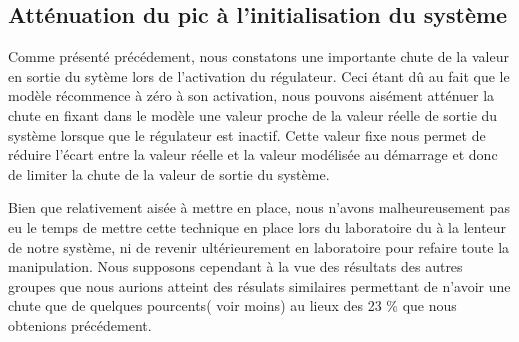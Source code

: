 \subsection{Atténuation du pic à l'initialisation du système}

Comme présenté précédement, nous constatons une importante chute de la valeur en sortie du sytème lors de l'activation du régulateur. Ceci étant dû au fait que le modèle récommence à zéro à son activation, nous pouvons aisément atténuer la chute en fixant dans le modèle une valeur proche de la valeur réelle de sortie du système lorsque que le régulateur est inactif. Cette valeur fixe nous permet de réduire l'écart entre la valeur réelle et la valeur modélisée au démarrage et donc de limiter la chute de la valeur de sortie du système. 

Bien que relativement aisée à mettre en place, nous n'avons malheureusement pas eu le temps de mettre cette technique en place lors du laboratoire du à la lenteur de notre système, ni de revenir ultérieurement en laboratoire pour refaire toute la manipulation. Nous supposons cependant à la vue des résultats des autres groupes que nous aurions atteint des résulats similaires permettant de n'avoir une chute que de quelques pourcents( voir moins) au lieux des 23 \% que nous obtenions précédement. 






